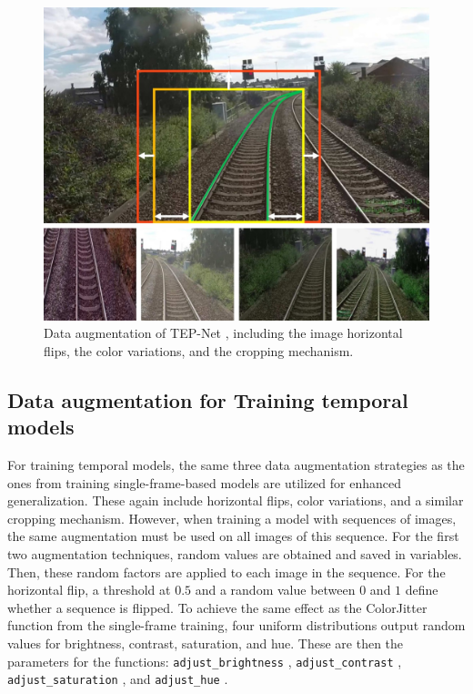 \begin{figure}[H]
    \centering
    \includegraphics[width=0.6\linewidth]{PICs/Baselinepaper/data_augmenation.jpg}
    \caption{Data augmentation of \ac{TEP}-Net \cite{tepNet2024}, including the image horizontal flips, the color variations, and the cropping mechanism.}
    \label{fig:tepNet_dataaugmentation}
\end{figure}

\subsection{Data augmentation for Training temporal models}
\label{sec:dataAugmentationTemporal}

For training temporal models, the same three data augmentation strategies as the ones from training single-frame-based models are utilized for enhanced generalization.
These again include horizontal flips, color variations, and a similar cropping mechanism.
However, when training a model with sequences of images, the same augmentation must be used on all images of this sequence.
For the first two augmentation techniques, random values are obtained and saved in variables.
Then, these random factors are applied to each image in the sequence.
For the horizontal flip, a threshold at $0.5$ and a random value between $0$ and $1$ define whether a sequence is flipped.
To achieve the same effect as the ColorJitter \cite{pytorch_colorJitter_docu} function from the single-frame training, four uniform distributions output random values for brightness, contrast, saturation, and hue.
These are then the parameters for the functions: \texttt{adjust\_brightness} \cite{pytorch_adjust_brightness_docu}, \texttt{adjust\_contrast} \cite{pytorch_adjust_contrast_docu}, \texttt{adjust\_saturation} \cite{pytorch_adjust_saturation_docu}, and \texttt{adjust\_hue} \cite{pytorch_adjust_hue_docu}.

